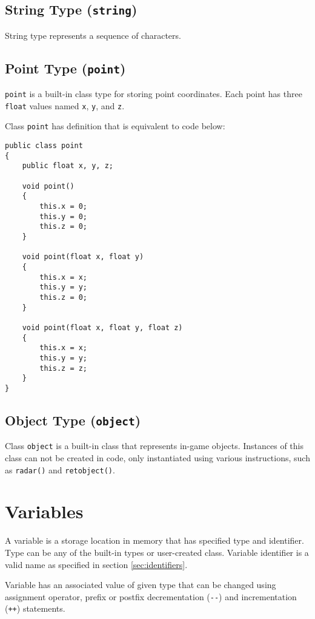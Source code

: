 \subsection{String Type (\texttt{string})}
String type represents a sequence of characters.


\subsection{Point Type (\texttt{point})}
\texttt{point} is a built-in class type for storing point coordinates. Each point has three \texttt{float} values named
\texttt{x}, \texttt{y}, and \texttt{z}.

Class \texttt{point} has definition that is equivalent to code below:

\begin{lstlisting}[style=cbot]
public class point
{
    public float x, y, z;
    
    void point()
    {
        this.x = 0;
        this.y = 0;
        this.z = 0;
    }

    void point(float x, float y)
    {
        this.x = x;
        this.y = y;
        this.z = 0;
    }
    
    void point(float x, float y, float z)
    {
        this.x = x;
        this.y = y;
        this.z = z;
    }
}
\end{lstlisting}


\subsection{Object Type (\texttt{object})}
Class \texttt{object} is a built-in class that represents in-game objects. Instances of this class can not be created in code, only instantiated using various instructions, such as \texttt{radar()} and \texttt{retobject()}.



\section{Variables}
A variable is a storage location in memory that has specified type and identifier. Type can be any of the built-in types or user-created class. Variable identifier is a valid name as specified in section \ref{sec:identifiers}.

Variable has an associated value of given type that can be changed using assignment operator, prefix or postfix decrementation (\texttt{-{}-}) and incrementation (\texttt{++}) statements.

